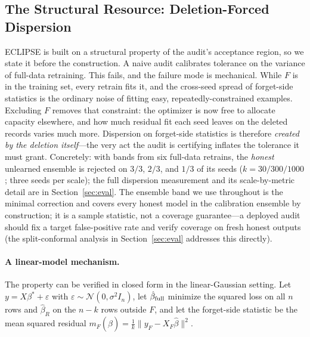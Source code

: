 \documentclass[lettersize,journal]{IEEEtran}
\begin{document}
\subsection{The Structural Resource: Deletion-Forced
Dispersion}\label{sec:region}\label{sec:calibration}
ECLIPSE is built on a structural property of the audit's
acceptance region, so we state it before the construction. A
naive audit calibrates tolerance on the variance of full-data
retraining. This fails, and the failure mode is mechanical.
While $F$ is in the training set, every retrain fits it, and
the cross-seed spread of forget-side statistics is the
ordinary noise of fitting easy, repeatedly-constrained
examples. Excluding $F$ removes that constraint: the optimizer
is now free to allocate capacity elsewhere, and how much
residual fit each seed leaves on the deleted records varies
much more. Dispersion on forget-side statistics is therefore
\emph{created by the deletion itself}---the very act the audit
is certifying inflates the tolerance it must grant.
Concretely: with bands from six full-data retrains, the
\emph{honest} unlearned ensemble is rejected on $3/3$, $2/3$,
and $1/3$ of its seeds ($k{=}30/300/1000$; three seeds per
scale); the full dispersion measurement and its
scale-by-metric detail are in Section~\ref{sec:eval}. The
ensemble band we use throughout is the minimal correction and
covers every honest model in the calibration ensemble by
construction; it is a sample statistic, not a coverage
guarantee---a deployed audit should fix a target
false-positive rate and verify coverage on fresh honest
outputs (the split-conformal analysis in
Section~\ref{sec:eval} addresses this directly).

\paragraph*{A linear-model mechanism.}
The property can be verified in closed form in the
linear-Gaussian setting. Let $y = X\beta^\ast + \varepsilon$ with $\varepsilon \sim
\mathcal{N}(0, \sigma^2 I_n)$, let $\hat\beta_{\rm full}$
minimize the squared loss on all $n$ rows and
$\hat\beta_{R}$ on the $n{-}k$ rows outside $F$, and let the
forget-side statistic be the mean squared residual
$m_F(\hat\beta) = \frac{1}{k}\|y_F - X_F\hat\beta\|^2$.
\end{document}

